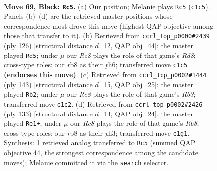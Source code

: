 \documentclass[11pt]{article}
\begin{document}
\clearpage

\begin{figure}[p]\centering
\begin{subfigure}{0.46\textwidth}\centering
\resizebox{\linewidth}{!}{%
\newchessgame
\chessboard[
  setfen={1R6/5p2/R3p1k1/8/P3P3/5PK1/8/2r5 b - - 30 69},
  showmover=false,
  pgfstyle=straightmove, color=movearrow, markmove={c1-c5}
]}
\caption{}
\end{subfigure}\hfill
\begin{subfigure}{0.46\textwidth}\centering
\resizebox{\linewidth}{!}{%
\newchessgame
\chessboard[
  setfen={3R4/1p3kp1/7p/7P/6P1/1r3PK1/8/8 w - - 31 64},
  showmover=false,
  pgfstyle=straightmove, color=movearrow, markmove={d8-d5}
]}
\caption{}
\end{subfigure}
\\[4pt]
\begin{subfigure}{0.46\textwidth}\centering
\resizebox{\linewidth}{!}{%
\newchessgame
\chessboard[
  setfen={8/8/1r3p1R/4k1p1/8/7P/6PK/8 b - - 4 72},
  showmover=false,
  pgfstyle=straightmove, color=movearrow, markmove={b6-b2}
]}
\caption{}
\end{subfigure}\hfill
\begin{subfigure}{0.46\textwidth}\centering
\resizebox{\linewidth}{!}{%
\newchessgame
\chessboard[
  setfen={8/8/3R1pk1/7p/4P3/4KP1P/8/1r6 b - - 19 67},
  showmover=false,
  pgfstyle=straightmove, color=movearrow, markmove={b1-e1}
]}
\caption{}
\end{subfigure}
\caption{\textbf{Move 69, Black: \texttt{Rc5}.} (a) Our position; Melanie plays \texttt{Rc5} (\texttt{c1c5}). Panels (b)--(d) are the retrieved master positions whose correspondence most drove this move (highest QAP objective among those that transfer to it). (b) Retrieved from \texttt{ccrl\_top\_p0000\#2439} (ply 126) [structural distance $d$=12, QAP obj=44]: the master played \texttt{Rd5}; under $\mu$ our \emph{Rc8} plays the role of that game's \emph{Rd8}; cross-type roles: our \emph{r}b8 as their \emph{p}h6; transferred move \texttt{c1c5} \textbf{(endorses this move)}. (c) Retrieved from \texttt{ccrl\_top\_p0002\#1444} (ply 143) [structural distance $d$=15, QAP obj=25]: the master played \texttt{Rb2}; under $\mu$ our \emph{Rc8} plays the role of that game's \emph{Rb3}; transferred move \texttt{c1c2}. (d) Retrieved from \texttt{ccrl\_top\_p0002\#2426} (ply 133) [structural distance $d$=13, QAP obj=24]: the master played \texttt{Re1+}; under $\mu$ our \emph{Rc8} plays the role of that game's \emph{Rb8}; cross-type roles: our \emph{r}b8 as their \emph{p}h3; transferred move \texttt{c1g1}. Synthesis: 1 retrieved analog transferred to \texttt{Rc5} (summed QAP objective 44, the strongest correspondence among the candidate moves); Melanie committed it via the \texttt{search} selector.}
\label{fig:thought-m137}
\end{figure}
\end{document}

